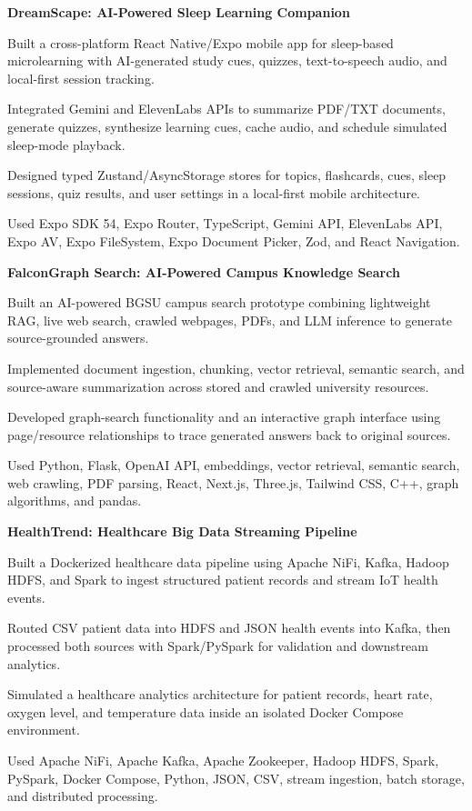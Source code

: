 \documentclass[letterpaper,10pt]{article}
\newcommand{\projectHeading}[2]{
  \vspace{2pt}
  \textbf{#1} \hfill #2
}
\begin{document}
\projectHeading{DreamScape: AI-Powered Sleep Learning Companion}{}
\begin{tightitemize}
  \item Built a cross-platform React Native/Expo mobile app for sleep-based microlearning with AI-generated study cues, quizzes, text-to-speech audio, and local-first session tracking.
  \item Integrated Gemini and ElevenLabs APIs to summarize PDF/TXT documents, generate quizzes, synthesize learning cues, cache audio, and schedule simulated sleep-mode playback.
  \item Designed typed Zustand/AsyncStorage stores for topics, flashcards, cues, sleep sessions, quiz results, and user settings in a local-first mobile architecture.
  \item Used Expo SDK 54, Expo Router, TypeScript, Gemini API, ElevenLabs API, Expo AV, Expo FileSystem, Expo Document Picker, Zod, and React Navigation.
\end{tightitemize}

\projectHeading{FalconGraph Search: AI-Powered Campus Knowledge Search}{}
\begin{tightitemize}
  \item Built an AI-powered BGSU campus search prototype combining lightweight RAG, live web search, crawled webpages, PDFs, and LLM inference to generate source-grounded answers.
  \item Implemented document ingestion, chunking, vector retrieval, semantic search, and source-aware summarization across stored and crawled university resources.
  \item Developed graph-search functionality and an interactive graph interface using page/resource relationships to trace generated answers back to original sources.
  \item Used Python, Flask, OpenAI API, embeddings, vector retrieval, semantic search, web crawling, PDF parsing, React, Next.js, Three.js, Tailwind CSS, C++, graph algorithms, and pandas.
\end{tightitemize}

\projectHeading{HealthTrend: Healthcare Big Data Streaming Pipeline}{}
\begin{tightitemize}
  \item Built a Dockerized healthcare data pipeline using Apache NiFi, Kafka, Hadoop HDFS, and Spark to ingest structured patient records and stream IoT health events.
  \item Routed CSV patient data into HDFS and JSON health events into Kafka, then processed both sources with Spark/PySpark for validation and downstream analytics.
  \item Simulated a healthcare analytics architecture for patient records, heart rate, oxygen level, and temperature data inside an isolated Docker Compose environment.
  \item Used Apache NiFi, Apache Kafka, Apache Zookeeper, Hadoop HDFS, Spark, PySpark, Docker Compose, Python, JSON, CSV, stream ingestion, batch storage, and distributed processing.
\end{tightitemize}
\end{document}
